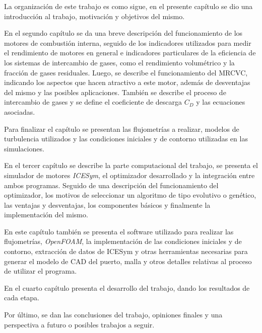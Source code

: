 La organización de este trabajo es como sigue, en el presente capítulo se dio
una introducción al trabajo, motivación y objetivos del mismo.

En el segundo capítulo se da una breve descripción del funcionamiento de los
motores de combustión interna, seguido de los indicadores utilizados para medir
el rendimiento de motores en general e indicadores particulares de la
eficiencia de los sistemas de intercambio de gases, como el rendimiento
volumétrico y la fracción de gases residuales.
%
Luego, se describe el funcionamiento del MRCVC, indicando los aspectos que
hacen atractivo a este motor, además de desventajas del mismo y las posibles
aplicaciones.
%
También se describe el proceso de intercambio de gases y se define el
coeficiente de descarga $C_D$ y las ecuaciones asociadas.

Para finalizar el capítulo se presentan las flujometrías a realizar, modelos de
turbulencia utilizados y las condiciones iniciales y de contorno utilizadas en
las simulaciones.
%

En el tercer capítulo se describe la parte computacional del trabajo, se
presenta el simulador de motores \emph{ICESym}, el optimizador desarrollado y la
integración entre ambos programas.
%
Seguido de una descripción del funcionamiento del optimizador, los motivos de
seleccionar un algoritmo de tipo evolutivo o genético, las ventajas y
desventajas, los componentes básicos y finalmente la implementación del mismo.

En este capítulo también se presenta el software utilizado para realizar las
flujometrías, \emph{OpenFOAM}, la implementación de las condiciones iniciales y
de contorno, extracción de datos de ICESym y otras herramientas necesarias para
generar el modelo de CAD del puerto, malla y otros detalles relativas al proceso
de utilizar el programa.

En el cuarto capítulo presenta el desarrollo del trabajo, dando los resultados
de cada etapa.

Por último, se dan las conclusiones del trabajo, opiniones finales y una
perspectiva a futuro o posibles trabajos a seguir.
